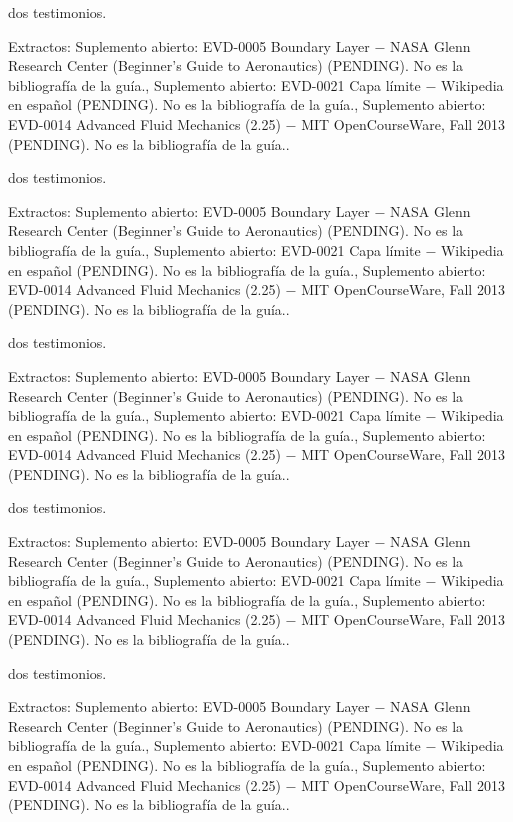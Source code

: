 \documentclass{book}
\begin{document}
\noindent dos testimonios.

\noindent Extractos: Suplemento abierto: EVD-0005 Boundary Layer \(-\) NASA Glenn Research Center (Beginner's Guide to Aeronautics) (PENDING). No es la bibliografía de la guía., Suplemento abierto: EVD-0021 Capa límite \(-\) Wikipedia en español (PENDING). No es la bibliografía de la guía., Suplemento abierto: EVD-0014 Advanced Fluid Mechanics (2.25) \(-\) MIT OpenCourseWare, Fall 2013 (PENDING). No es la bibliografía de la guía..

\noindent dos testimonios.

\noindent Extractos: Suplemento abierto: EVD-0005 Boundary Layer \(-\) NASA Glenn Research Center (Beginner's Guide to Aeronautics) (PENDING). No es la bibliografía de la guía., Suplemento abierto: EVD-0021 Capa límite \(-\) Wikipedia en español (PENDING). No es la bibliografía de la guía., Suplemento abierto: EVD-0014 Advanced Fluid Mechanics (2.25) \(-\) MIT OpenCourseWare, Fall 2013 (PENDING). No es la bibliografía de la guía..

\noindent dos testimonios.

\noindent Extractos: Suplemento abierto: EVD-0005 Boundary Layer \(-\) NASA Glenn Research Center (Beginner's Guide to Aeronautics) (PENDING). No es la bibliografía de la guía., Suplemento abierto: EVD-0021 Capa límite \(-\) Wikipedia en español (PENDING). No es la bibliografía de la guía., Suplemento abierto: EVD-0014 Advanced Fluid Mechanics (2.25) \(-\) MIT OpenCourseWare, Fall 2013 (PENDING). No es la bibliografía de la guía..

\noindent dos testimonios.

\noindent Extractos: Suplemento abierto: EVD-0005 Boundary Layer \(-\) NASA Glenn Research Center (Beginner's Guide to Aeronautics) (PENDING). No es la bibliografía de la guía., Suplemento abierto: EVD-0021 Capa límite \(-\) Wikipedia en español (PENDING). No es la bibliografía de la guía., Suplemento abierto: EVD-0014 Advanced Fluid Mechanics (2.25) \(-\) MIT OpenCourseWare, Fall 2013 (PENDING). No es la bibliografía de la guía..

\noindent dos testimonios.

\noindent Extractos: Suplemento abierto: EVD-0005 Boundary Layer \(-\) NASA Glenn Research Center (Beginner's Guide to Aeronautics) (PENDING). No es la bibliografía de la guía., Suplemento abierto: EVD-0021 Capa límite \(-\) Wikipedia en español (PENDING). No es la bibliografía de la guía., Suplemento abierto: EVD-0014 Advanced Fluid Mechanics (2.25) \(-\) MIT OpenCourseWare, Fall 2013 (PENDING). No es la bibliografía de la guía..
\end{document}
